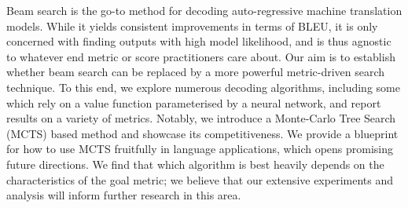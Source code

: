 Beam search is the go-to method for decoding auto-regressive machine translation models. While it yields consistent improvements in terms of BLEU, it is only concerned with finding outputs with high model likelihood, and is thus agnostic to whatever end metric or score practitioners care about. Our aim is to establish whether beam search can be replaced by a more powerful metric-driven search technique. To this end, we explore numerous decoding algorithms, including some which rely on a value function parameterised by a neural network, and report results on a variety of metrics. Notably, we introduce a Monte-Carlo Tree Search (MCTS) based method and showcase its competitiveness. We provide a blueprint for how to use MCTS fruitfully in language applications, which opens promising future directions. We find that which algorithm is best heavily depends on the characteristics of the goal metric; we believe that our extensive experiments and analysis will inform further research in this area.
